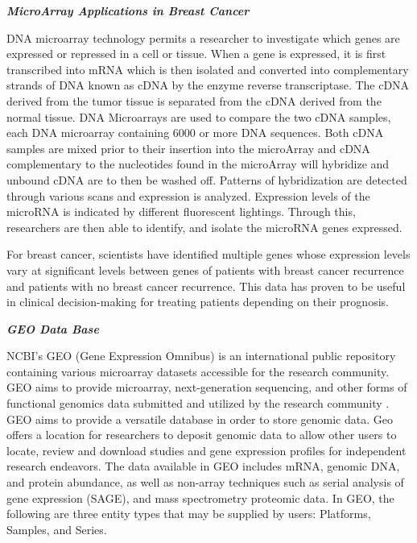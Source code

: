 \documentclass{bioinfo}
\begin{document}
{\textbf {\emph{MicroArray Applications in Breast Cancer}}}

DNA microarray technology permits a researcher to investigate which genes are expressed or repressed in a cell or tissue. When a gene is expressed, it is first transcribed into mRNA which is then isolated and converted into complementary strands of DNA known as cDNA by the enzyme reverse transcriptase. The cDNA derived from the tumor tissue is separated from the cDNA derived from the normal tissue. DNA Microarrays are used to compare the two cDNA samples, each DNA microarray containing 6000 or more DNA sequences. Both cDNA samples are mixed prior to their insertion into the microArray and cDNA complementary to the nucleotides found in the microArray will hybridize and unbound cDNA are to then be washed off. Patterns of hybridization are detected through various scans and expression is analyzed. Expression levels of the microRNA is indicated by different fluorescent lightings. Through this, researchers are then able to identify, and isolate the microRNA genes expressed. 

For breast cancer, scientists have identified multiple genes whose expression levels vary at significant levels between genes of patients with breast cancer recurrence and patients with no breast cancer recurrence. This data has proven to be useful in clinical decision-making for treating patients depending on their prognosis. \cite{microarray}

 

{\textbf {\emph{GEO Data Base}}}

NCBI’s GEO (Gene Expression Omnibus) is an international public repository containing various microarray datasets accessible for the research community. GEO aims to provide microarray, next-generation sequencing, and other forms of functional genomics data submitted and utilized by the research community \cite{ncbi-geo}. GEO aims to provide a versatile database in order to store genomic data. Geo offers a location for researchers to deposit genomic data to allow other users to locate, review and download studies and gene expression profiles for independent research endeavors. 
The data available in GEO includes mRNA, genomic DNA, and protein abundance, as well as non-array techniques such as serial analysis of gene expression (SAGE), and mass spectrometry proteomic data. In GEO, the following are three entity types that may be supplied by users: Platforms, Samples, and Series.
\end{document}
